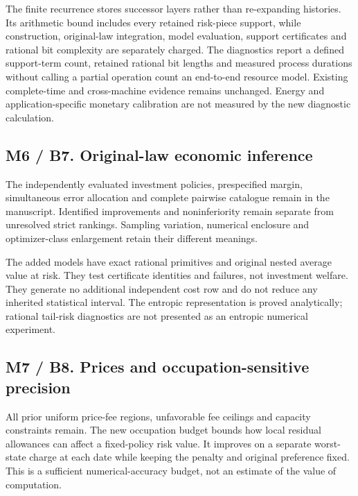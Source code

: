 The finite recurrence stores successor layers rather than re-expanding
histories. Its arithmetic bound includes every retained risk-piece
support, while construction, original-law integration, model evaluation,
support certificates and rational bit complexity are separately charged.
The diagnostics report a defined support-term count, retained rational
bit lengths and measured process durations without calling a partial
operation count an end-to-end resource model. Existing complete-time and
cross-machine evidence remains unchanged. Energy and
application-specific monetary calibration are not measured by the new
diagnostic calculation.

\hypertarget{m6-b7.-original-law-economic-inference}{%
\subsection{M6 / B7. Original-law economic
inference}\label{m6-b7.-original-law-economic-inference}}

The independently evaluated investment policies, prespecified margin,
simultaneous error allocation and complete pairwise catalogue remain in
the manuscript. Identified improvements and noninferiority remain
separate from unresolved strict rankings. Sampling variation, numerical
enclosure and optimizer-class enlargement retain their different
meanings.

The added models have exact rational primitives and original nested
average value at risk. They test certificate identities and failures,
not investment welfare. They generate no additional independent cost row
and do not reduce any inherited statistical interval. The entropic
representation is proved analytically; rational tail-risk diagnostics
are not presented as an entropic numerical experiment.

\hypertarget{m7-b8.-prices-and-occupation-sensitive-precision}{%
\subsection{M7 / B8. Prices and occupation-sensitive
precision}\label{m7-b8.-prices-and-occupation-sensitive-precision}}

All prior uniform price-fee regions, unfavorable fee ceilings and
capacity constraints remain. The new occupation budget bounds how local
residual allowances can affect a fixed-policy risk value. It improves on
a separate worst-state charge at each date while keeping the penalty and
original preference fixed. This is a sufficient numerical-accuracy
budget, not an estimate of the value of computation.


